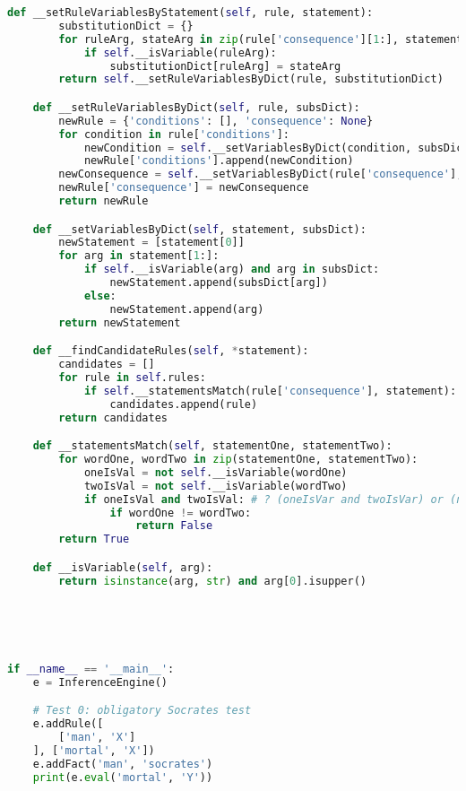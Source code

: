 \begin{lstlisting}[language=python]
    def __setRuleVariablesByStatement(self, rule, statement):
        substitutionDict = {}
        for ruleArg, stateArg in zip(rule['consequence'][1:], statement[1:]):
            if self.__isVariable(ruleArg):
                substitutionDict[ruleArg] = stateArg
        return self.__setRuleVariablesByDict(rule, substitutionDict)

    def __setRuleVariablesByDict(self, rule, subsDict):
        newRule = {'conditions': [], 'consequence': None}
        for condition in rule['conditions']:
            newCondition = self.__setVariablesByDict(condition, subsDict)
            newRule['conditions'].append(newCondition)
        newConsequence = self.__setVariablesByDict(rule['consequence'], subsDict)
        newRule['consequence'] = newConsequence
        return newRule

    def __setVariablesByDict(self, statement, subsDict):
        newStatement = [statement[0]]
        for arg in statement[1:]:
            if self.__isVariable(arg) and arg in subsDict:
                newStatement.append(subsDict[arg])
            else:
                newStatement.append(arg)
        return newStatement

    def __findCandidateRules(self, *statement):
        candidates = []
        for rule in self.rules:
            if self.__statementsMatch(rule['consequence'], statement):
                candidates.append(rule)
        return candidates

    def __statementsMatch(self, statementOne, statementTwo):
        for wordOne, wordTwo in zip(statementOne, statementTwo):
            oneIsVal = not self.__isVariable(wordOne)
            twoIsVal = not self.__isVariable(wordTwo)
            if oneIsVal and twoIsVal: # ? (oneIsVar and twoIsVar) or (not oneIsVar and not twoIsVar):
                if wordOne != wordTwo:
                    return False
        return True

    def __isVariable(self, arg):
        return isinstance(arg, str) and arg[0].isupper()





if __name__ == '__main__':
    e = InferenceEngine() 

    # Test 0: obligatory Socrates test
    e.addRule([
        ['man', 'X']
    ], ['mortal', 'X'])
    e.addFact('man', 'socrates')
    print(e.eval('mortal', 'Y'))
\end{lstlisting}
